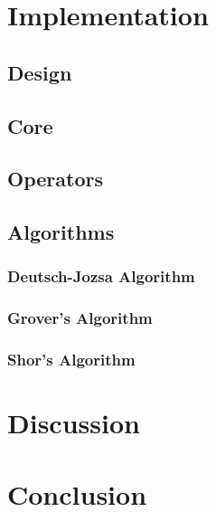 \documentclass{article}
\begin{document}
\begin{onehalfspace}
\section{Implementation}
\subsection{Design}


\subsection{Core}


\subsection{Operators}


\subsection{Algorithms}
\subsubsection{Deutsch-Jozsa Algorithm}

\subsubsection{Grover's Algorithm}

\subsubsection{Shor's Algorithm}


\section{Discussion}


\section{Conclusion}

\clearpage

\end{onehalfspace}



\end{document}
